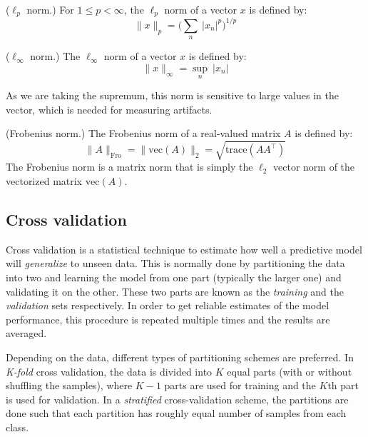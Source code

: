 \begin{definition}{($\ell_p$ norm.)}
For $1 \leq p < \infty$, the $\ell_p$ norm of a vector $x$ is defined by:
\begin{equation}
\|x\|_p = \Big(\sum_n \ \lvert x_n \rvert^p \Big)^{1/p}
\end{equation}
\end{definition}
%
\begin{definition}{($\ell_\infty$ norm.)}
The $\ell_\infty$ norm of a vector $x$ is defined by:
\begin{equation}
\|x\|_{\infty} = \sup_n \ \lvert x_n \rvert
\end{equation}
\label{def:norm}
\end{definition}
As we are taking the supremum, this norm is sensitive to large values in the vector, which is needed for measuring artifacts.
%
\begin{definition}{(Frobenius norm.)}
The Frobenius norm of a real-valued matrix $A$ is defined by:
\begin{equation}
\|A\|_{\mathrm{Fro}} = \| \mathrm{vec}(A) \|_2 = \sqrt{\mathrm{trace}(AA^\top)}
\end{equation}
%
The Frobenius norm is a matrix norm that is simply the $\ell_2$ vector norm of the vectorized matrix $\mathrm{vec}(A)$.

\end{definition}

\subsection{Cross validation}

Cross validation is a statistical technique to estimate how well a predictive model will \emph{generalize} to unseen data. This is normally done by partitioning the data into two and learning the model from one part (typically the larger one) and validating it on the other. These two parts are known as the \emph{training} and the \emph{validation} sets respectively. In order to get reliable estimates of the model performance, this procedure is repeated multiple times and the results are averaged.

Depending on the data, different types of partitioning schemes are preferred. In \emph{K-fold} cross validation, the data is divided into $K$ equal parts (with or without shuffling the samples), where $K - 1$ parts are used for training and the $K$th part is used for validation. In a \emph{stratified} cross-validation scheme, the partitions are done such that each partition has roughly equal number of samples from each class.

